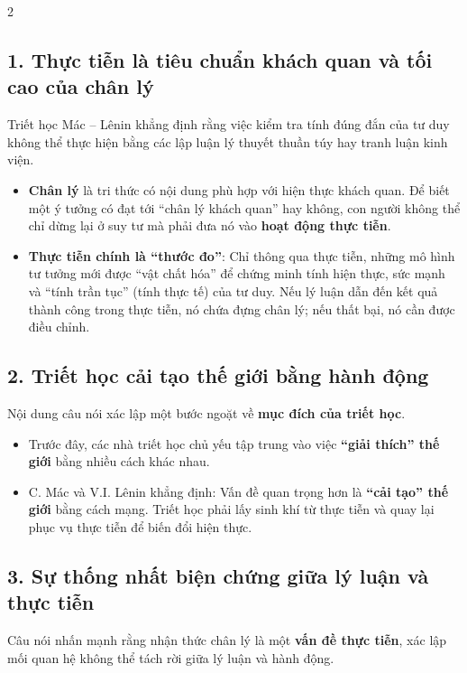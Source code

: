 \documentclass[9pt,a4paper]{extarticle}
\begin{document}
\begin{multicols*}{2}
\subsection*{1. Thực tiễn là tiêu chuẩn khách quan và tối cao của chân lý}

Triết học Mác -- Lênin khẳng định rằng việc kiểm tra tính đúng đắn của tư duy không thể thực hiện bằng các lập luận lý thuyết thuần túy hay tranh luận kinh viện.

\begin{itemize}
\item \textbf{Chân lý} là tri thức có nội dung phù hợp với hiện thực khách quan. Để biết một ý tưởng có đạt tới ``chân lý khách quan'' hay không, con người không thể chỉ dừng lại ở suy tư mà phải đưa nó vào \textbf{hoạt động thực tiễn}.
\item \textbf{Thực tiễn chính là ``thước đo''}: Chỉ thông qua thực tiễn, những mô hình tư tưởng mới được ``vật chất hóa'' để chứng minh tính hiện thực, sức mạnh và ``tính trần tục'' (tính thực tế) của tư duy. Nếu lý luận dẫn đến kết quả thành công trong thực tiễn, nó chứa đựng chân lý; nếu thất bại, nó cần được điều chỉnh.
\end{itemize}

\subsection*{2. Triết học cải tạo thế giới bằng hành động}

Nội dung câu nói xác lập một bước ngoặt về \textbf{mục đích của triết học}.

\begin{itemize}
\item Trước đây, các nhà triết học chủ yếu tập trung vào việc \textbf{``giải thích'' thế giới} bằng nhiều cách khác nhau.
\item C. Mác và V.I. Lênin khẳng định: Vấn đề quan trọng hơn là \textbf{``cải tạo'' thế giới} bằng cách mạng. Triết học phải lấy sinh khí từ thực tiễn và quay lại phục vụ thực tiễn để biến đổi hiện thực.
\end{itemize}

\subsection*{3. Sự thống nhất biện chứng giữa lý luận và thực tiễn}

Câu nói nhấn mạnh rằng nhận thức chân lý là một \textbf{vấn đề thực tiễn}, xác lập mối quan hệ không thể tách rời giữa lý luận và hành động.


\end{multicols*}
\end{document}
